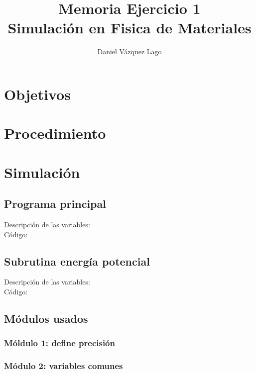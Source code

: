 \documentclass[12pt]{article}
\title{Memoria Ejercicio 1 \\ Simulación en Fisica de Materiales} %
\author{Daniel Vázquez Lago} %
\begin{document}
\maketitle

\newpage

\tableofcontents


\newpage

\section{Objetivos}

\section{Procedimiento}

\section{Simulación}

\subsection{Programa principal}

Descripción de las variables: \\

Código:

\subsection{Subrutina energía potencial}

Descripción de las variables: \\

Código:

\subsection{Módulos usados}

\subsubsection{Móldulo 1: define precisión}

\subsubsection{Módulo 2: variables comunes}
\end{document}
